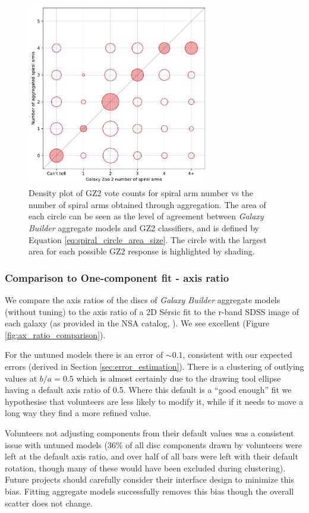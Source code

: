 \documentclass[../main.tex]{subfiles}
\begin{document}
\begin{figure}
  \includegraphics[width=8cm]{images__results/spiral-number-vs-gz2.pdf}
  \caption{Density plot of GZ2 vote counts for spiral arm number vs the number of spiral arms obtained through aggregation. The area of each circle can be seen as the level of agreement between \textit{Galaxy Builder} aggregate models and GZ2 classifiers, and is defined by Equation \ref{eq:spiral_circle_area_size}. The circle with the largest area for each possible GZ2 response is highlighted by shading.}
  \label{fig:n_spirals_comparison}
\end{figure}


\subsubsection{Comparison to One-component fit - axis ratio}
We compare the axis ratios of the discs of \textit{Galaxy Builder} aggregate models (without tuning) to the axis ratio of a 2D S\'ersic fit to the r-band SDSS image of each galaxy (as provided in the NSA catalog, \citealt{2011AJ....142...31B}). We see excellent (Figure \ref{fig:ax_ratio_comparison}).

For the untuned models there is an error of $\sim0.1$, consistent with our expected errors (derived in Section \ref{sec:error_estimation}). There is a clustering of outlying values at $b/a=0.5$ which is almost certainly due to the drawing tool ellipse having a default axis ratio of 0.5. Where this default is a ``good enough'' fit we hypothesise that volunteers are less likely to modify it, while if it needs to move a long way they find a more refined value.

Volunteers not adjusting components from their default values was a consistent issue with untuned models (36\% of all disc components drawn by volunteers were left at the default axis ratio, and over half of all bars were left with their default rotation, though many of these would have been excluded during clustering). Future projects should carefully consider their interface design to minimize this bias. Fitting aggregate models successfully removes this bias though the overall scatter does not change.
\end{document}
